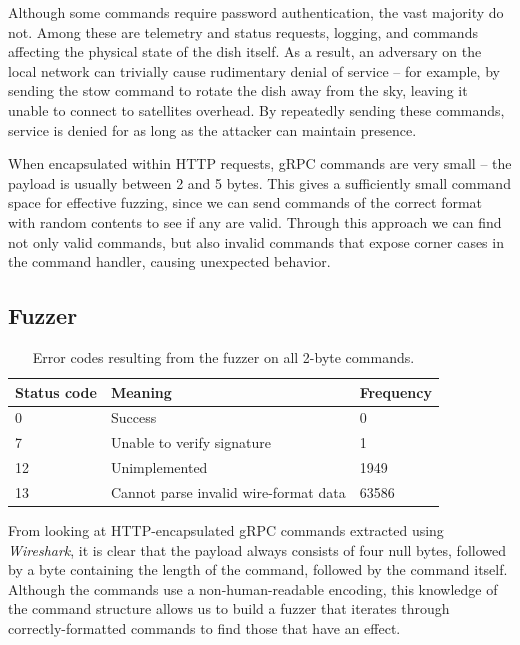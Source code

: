 Although some commands require password authentication, the vast majority do not.
Among these are telemetry and status requests, logging, and commands affecting the physical state of the dish itself.
As a result, an adversary on the local network can trivially cause rudimentary denial of service -- for example, by sending the stow command to rotate the dish away from the sky, leaving it unable to connect to satellites overhead.
By repeatedly sending these commands, service is denied for as long as the attacker can maintain presence.

When encapsulated within HTTP requests, gRPC commands are very small -- the payload is usually between 2 and 5 bytes.
This gives a sufficiently small command space for effective fuzzing, since we can send commands of the correct format with random contents to see if any are valid.
Through this approach we can find not only valid commands, but also invalid commands that expose corner cases in the command handler, causing unexpected behavior.


\subsection{Fuzzer}\label{sec:fuzzer}

\begin{table}
    \centering
    \begin{tabular}{lll}
        \toprule
        Status code & Meaning & Frequency \\
        \midrule
        0  & Success                               & 0     \\
        7  & Unable to verify signature            & 1     \\
        12 & Unimplemented                         & 1949  \\
        13 & Cannot parse invalid wire-format data & 63586 \\
        \bottomrule
    \end{tabular}
\caption{Error codes resulting from the fuzzer on all 2-byte commands.}
\label{tab:fuzzer-results}
\end{table}

From looking at HTTP-encapsulated gRPC commands extracted using \textit{Wireshark}, it is clear that the payload always consists of four null bytes, followed by a byte containing the length of the command, followed by the command itself.
Although the commands use a non-human-readable encoding, this knowledge of the command structure allows us to build a fuzzer that iterates through correctly-formatted commands to find those that have an effect.

